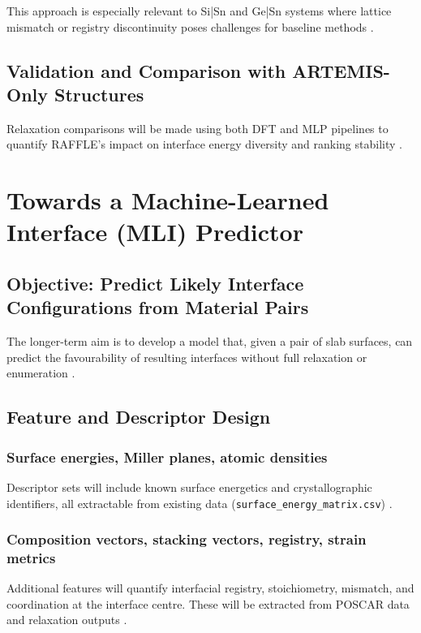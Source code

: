 This approach is especially relevant to Si|Sn and Ge|Sn systems where lattice mismatch or registry discontinuity poses challenges for baseline methods .

\subsection{Validation and Comparison with ARTEMIS-Only Structures}

Relaxation comparisons will be made using both DFT and MLP pipelines to quantify RAFFLE's impact on interface energy diversity and ranking stability .


\section{Towards a Machine-Learned Interface (MLI) Predictor}

\subsection{Objective: Predict Likely Interface Configurations from Material Pairs}

The longer-term aim is to develop a model that, given a pair of slab surfaces, can predict the favourability of resulting interfaces without full relaxation or enumeration .

\subsection{Feature and Descriptor Design}

\subsubsection{Surface energies, Miller planes, atomic densities}

Descriptor sets will include known surface energetics and crystallographic identifiers, all extractable from existing data (\texttt{surface\_energy\_matrix.csv}) .

\subsubsection{Composition vectors, stacking vectors, registry, strain metrics}

Additional features will quantify interfacial registry, stoichiometry, mismatch, and coordination at the interface centre. These will be extracted from POSCAR data and relaxation outputs .

